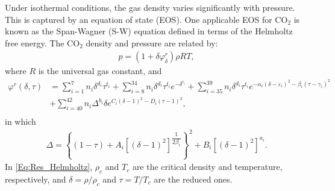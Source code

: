 Under isothermal conditions, the gas density varies significantly with pressure. This is {captured} by an equation of state (EOS). One applicable EOS for CO$_2$ is known as the Span-Wagner (S-W) equation \cite{span1996new} defined in terms of the Helmholtz free energy. The CO$_2$ density and pressure are related by:
\begin{equation}\label{Eq:Density_Pressure}
    \begin{aligned}
        p=\left(1+\delta\varphi^r_{\delta}\right)\rho RT,
    \end{aligned}
\end{equation}
where $R$ is the universal gas constant, and 
\begin{equation}\label{Eq:Res_Helmholtz}
    \begin{aligned}
        \varphi^r\left(\delta,\tau\right) &= \sum_{i=1}^{7} n_i  \delta^{d_i}\tau^{t_i}+\sum_{i=8}^{34} n_i\delta^{d_i} \tau^{t_i} e^{-\delta^{c_i}}+ \sum_{i=35}^{39} n_i  \delta^{d_i}\tau^{t_i} e^{-\alpha_i\left(\delta-\varepsilon_i \right)^2-\beta_i\left(\tau-\gamma_i\right)^2}\\ &+\sum_{i=40}^{42} n_i\Delta^{b_i}\delta e^{C_i\left(\delta-1\right)^2-D_i\left(\tau-1\right) ^2},\\
    \end{aligned}
\end{equation}
in which
\begin{equation*}\label{Eq:Delta}
    \begin{aligned}
        \Delta=\left\lbrace\left(1-\tau \right)+A_i\left[\left(\delta-1 \right)^2\right]^{\dfrac{1}{2\beta_i}}\right\rbrace ^2+B_i\left[\left(\delta-1 \right)^2\right]^{a_i}.
    \end{aligned}
\end{equation*}
In \eqref{Eq:Res_Helmholtz}, $\rho_c$ and $T_c$ are the critical density and temperature, respectively, and $\delta=\rho/\rho_c$ and $\tau=T/T_c$ are the reduced ones. 

